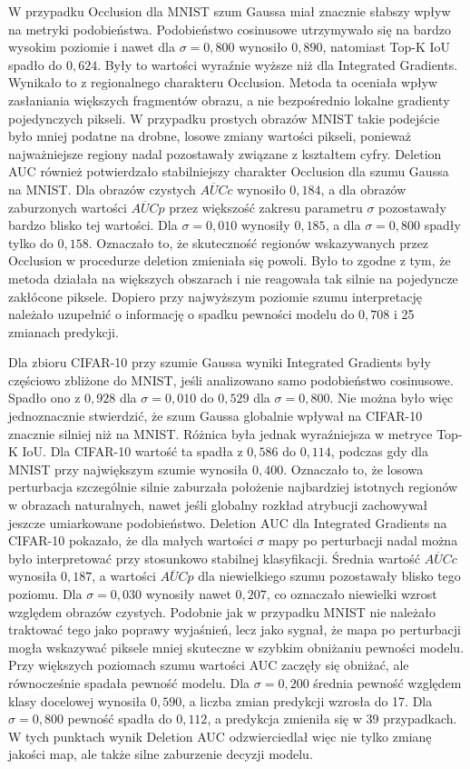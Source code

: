 W przypadku Occlusion dla MNIST szum Gaussa miał znacznie słabszy wpływ na metryki podobieństwa. Podobieństwo cosinusowe utrzymywało się na bardzo wysokim poziomie i nawet dla $\sigma = 0{,}800$ wynosiło $0{,}890$, natomiast Top-K IoU spadło do $0{,}624$. Były to wartości wyraźnie wyższe niż dla Integrated Gradients. Wynikało to z regionalnego charakteru Occlusion. Metoda ta oceniała wpływ zasłaniania większych fragmentów obrazu, a nie bezpośrednio lokalne gradienty pojedynczych pikseli. W przypadku prostych obrazów MNIST takie podejście było mniej podatne na drobne, losowe zmiany wartości pikseli, ponieważ najważniejsze regiony nadal pozostawały związane z kształtem cyfry. Deletion AUC również potwierdzało stabilniejszy charakter Occlusion dla szumu Gaussa na MNIST. Dla obrazów czystych $\overline{AUC}{c}$ wynosiło $0{,}184$, a dla obrazów zaburzonych wartości $\overline{AUC}{p}$ przez większość zakresu parametru $\sigma$ pozostawały bardzo blisko tej wartości. Dla $\sigma = 0{,}010$ wynosiły $0{,}185$, a dla $\sigma = 0{,}800$ spadły tylko do $0{,}158$. Oznaczało to, że skuteczność regionów wskazywanych przez Occlusion w procedurze deletion zmieniała się powoli. Było to zgodne z tym, że metoda działała na większych obszarach i nie reagowała tak silnie na pojedyncze zakłócone piksele. Dopiero przy najwyższym poziomie szumu interpretację należało uzupełnić o informację o spadku pewności modelu do $0{,}708$ i 25 zmianach predykcji.

Dla zbioru CIFAR-10 przy szumie Gaussa wyniki Integrated Gradients były częściowo zbliżone do MNIST, jeśli analizowano samo podobieństwo cosinusowe. Spadło ono z $0{,}928$ dla $\sigma = 0{,}010$ do $0{,}529$ dla $\sigma = 0{,}800$. Nie można było więc jednoznacznie stwierdzić, że szum Gaussa globalnie wpływał na CIFAR-10 znacznie silniej niż na MNIST. Różnica była jednak wyraźniejsza w metryce Top-K IoU. Dla CIFAR-10 wartość ta spadła z $0{,}586$ do $0{,}114$, podczas gdy dla MNIST przy największym szumie wynosiła $0{,}400$. Oznaczało to, że losowa perturbacja szczególnie silnie zaburzała położenie najbardziej istotnych regionów w obrazach naturalnych, nawet jeśli globalny rozkład atrybucji zachowywał jeszcze umiarkowane podobieństwo. Deletion AUC dla Integrated Gradients na CIFAR-10 pokazało, że dla małych wartości $\sigma$ mapy po perturbacji nadal można było interpretować przy stosunkowo stabilnej klasyfikacji. Średnia wartość $\overline{AUC}{c}$ wynosiła $0{,}187$, a wartości $\overline{AUC}{p}$ dla niewielkiego szumu pozostawały blisko tego poziomu. Dla $\sigma = 0{,}030$ wynosiły nawet $0{,}207$, co oznaczało niewielki wzrost względem obrazów czystych. Podobnie jak w przypadku MNIST nie należało traktować tego jako poprawy wyjaśnień, lecz jako sygnał, że mapa po perturbacji mogła wskazywać piksele mniej skuteczne w szybkim obniżaniu pewności modelu. Przy większych poziomach szumu wartości AUC zaczęły się obniżać, ale równocześnie spadała pewność modelu. Dla $\sigma = 0{,}200$ średnia pewność względem klasy docelowej wynosiła $0{,}590$, a liczba zmian predykcji wzrosła do 17. Dla $\sigma = 0{,}800$ pewność spadła do $0{,}112$, a predykcja zmieniła się w 39 przypadkach. W tych punktach wynik Deletion AUC odzwierciedlał więc nie tylko zmianę jakości map, ale także silne zaburzenie decyzji modelu.

